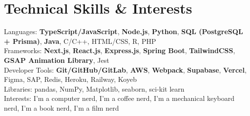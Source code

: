\documentclass[letterpaper,11pt]{article}
\begin{document}
%
\section{Technical Skills \& Interests}
 \begin{itemize}[leftmargin=0.15in, label={}]
    \small{\item{
     {Languages}{: \textbf{TypeScript/JavaScript}, \textbf{Node.js}, \textbf{Python}, \textbf{SQL (PostgreSQL + Prisma)}, \textbf{Java}, C/C++, HTML/CSS, R, PHP} \\
     {Frameworks}{: \textbf{Next.js}, \textbf{React.js}, \textbf{Express.js}, \textbf{Spring Boot}, \textbf{TailwindCSS}, \textbf{GSAP Animation Library}, Jest} \\
     {Developer Tools}{: \textbf{Git/GitHub/GitLab}, \textbf{AWS}, \textbf{Webpack}, \textbf{Supabase}, \textbf{Vercel}, Figma, SAP, Redis, Heroku, Railway, Koyeb} \\
     {Libraries}{: pandas, NumPy, Matplotlib, seaborn, sci-kit learn} \\
     {Interests}{: I’m a computer nerd, I’m a coffee nerd, I’m a mechanical keyboard nerd, I’m a book nerd, I’m a film nerd}
    }}
 \end{itemize}


\end{document}
